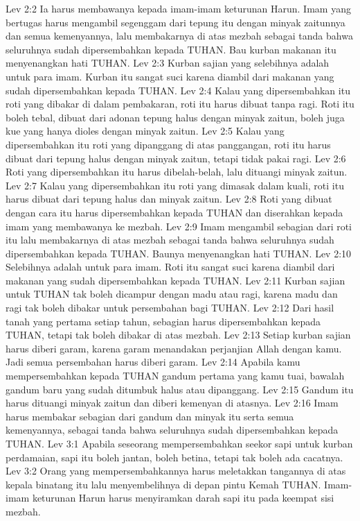 Lev 2:2  Ia harus membawanya kepada imam-imam keturunan Harun. Imam yang bertugas harus mengambil segenggam dari tepung itu dengan minyak zaitunnya dan semua kemenyannya, lalu membakarnya di atas mezbah sebagai tanda bahwa seluruhnya sudah dipersembahkan kepada TUHAN. Bau kurban makanan itu menyenangkan hati TUHAN.
Lev 2:3  Kurban sajian yang selebihnya adalah untuk para imam. Kurban itu sangat suci karena diambil dari makanan yang sudah dipersembahkan kepada TUHAN.
Lev 2:4  Kalau yang dipersembahkan itu roti yang dibakar di dalam pembakaran, roti itu harus dibuat tanpa ragi. Roti itu boleh tebal, dibuat dari adonan tepung halus dengan minyak zaitun, boleh juga kue yang hanya dioles dengan minyak zaitun.
Lev 2:5  Kalau yang dipersembahkan itu roti yang dipanggang di atas panggangan, roti itu harus dibuat dari tepung halus dengan minyak zaitun, tetapi tidak pakai ragi.
Lev 2:6  Roti yang dipersembahkan itu harus dibelah-belah, lalu dituangi minyak zaitun.
Lev 2:7  Kalau yang dipersembahkan itu roti yang dimasak dalam kuali, roti itu harus dibuat dari tepung halus dan minyak zaitun.
Lev 2:8  Roti yang dibuat dengan cara itu harus dipersembahkan kepada TUHAN dan diserahkan kepada imam yang membawanya ke mezbah.
Lev 2:9  Imam mengambil sebagian dari roti itu lalu membakarnya di atas mezbah sebagai tanda bahwa seluruhnya sudah dipersembahkan kepada TUHAN. Baunya menyenangkan hati TUHAN.
Lev 2:10  Selebihnya adalah untuk para imam. Roti itu sangat suci karena diambil dari makanan yang sudah dipersembahkan kepada TUHAN.
Lev 2:11  Kurban sajian untuk TUHAN tak boleh dicampur dengan madu atau ragi, karena madu dan ragi tak boleh dibakar untuk persembahan bagi TUHAN.
Lev 2:12  Dari hasil tanah yang pertama setiap tahun, sebagian harus dipersembahkan kepada TUHAN, tetapi tak boleh dibakar di atas mezbah.
Lev 2:13  Setiap kurban sajian harus diberi garam, karena garam menandakan perjanjian Allah dengan kamu. Jadi semua persembahan harus diberi garam.
Lev 2:14  Apabila kamu mempersembahkan kepada TUHAN gandum pertama yang kamu tuai, bawalah gandum baru yang sudah ditumbuk halus atau dipanggang.
Lev 2:15  Gandum itu harus dituangi minyak zaitun dan diberi kemenyan di atasnya.
Lev 2:16  Imam harus membakar sebagian dari gandum dan minyak itu serta semua kemenyannya, sebagai tanda bahwa seluruhnya sudah dipersembahkan kepada TUHAN.
Lev 3:1  Apabila seseorang mempersembahkan seekor sapi untuk kurban perdamaian, sapi itu boleh jantan, boleh betina, tetapi tak boleh ada cacatnya.
Lev 3:2  Orang yang mempersembahkannya harus meletakkan tangannya di atas kepala binatang itu lalu menyembelihnya di depan pintu Kemah TUHAN. Imam-imam keturunan Harun harus menyiramkan darah sapi itu pada keempat sisi mezbah.
